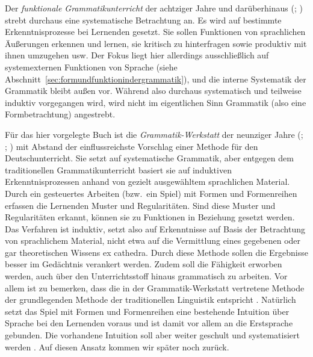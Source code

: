 Der \textit{funktionale Grammatikunterricht} der achtziger Jahre und darüberhinaus (\citealt[233--239]{Bredel2013}; \citealt{Koeller1997}) strebt durchaus eine systematische Betrachtung an.
Es wird auf bestimmte Erkenntnisprozesse bei Lernenden gesetzt.
Sie sollen Funktionen von sprachlichen Äußerungen erkennen und lernen, sie kritisch zu hinterfragen sowie produktiv mit ihnen umzugehen usw.
Der Fokus liegt hier allerdings ausschließlich auf systemexternen Funktionen von Sprache (siehe Abschnitt~\ref{sec:formundfunktionindergrammatik}), und die interne Systematik der Grammatik bleibt außen vor.
Während also durchaus systematisch und teilweise induktiv vorgegangen wird, wird nicht im eigentlichen Sinn Grammatik (also eine Formbetrachtung) angestrebt.

Für das hier vorgelegte Buch ist die \textit{Grammatik-Werkstatt} der neunziger Jahre (\citealt{EisenbergMenzel1995}; \citealt{Menzel2017}; \citealt[Abschnitt~3.2.4]{Bredel2013}) mit Abstand der einflussreichste Vorschlag einer Methode für den Deutschunterricht.
Sie setzt auf systematische Grammatik, aber entgegen dem traditionellen Grammatikunterricht basiert sie auf induktiven Erkenntnisprozessen anhand von gezielt ausgewähltem sprachlichen Material.
Durch ein gesteuertes Arbeiten (bzw.\ ein Spiel) mit Formen und Formenreihen erfassen die Lernenden Muster und Regularitäten.
Sind diese Muster und Regularitäten erkannt, können sie zu Funktionen in Beziehung gesetzt werden.
Das Verfahren ist induktiv, setzt also auf Erkenntnisse auf Basis der Betrachtung von sprachlichem Material, nicht etwa auf die Vermittlung eines gegebenen oder gar theoretischen Wissens ex cathedra.
Durch diese Methode sollen die Ergebnisse besser im Gedächtnis verankert werden.
Zudem soll die Fähigkeit erworben werden, auch über den Unterrichtsstoff hinaus grammatisch zu arbeiten.
Vor allem ist zu bemerken, dass die in der Grammatik-Werkstatt vertretene Methode der grundlegenden Methode der traditionellen Linguistik entspricht \citep[239]{Bredel2013}.
Natürlich setzt das Spiel mit Formen und Formenreihen eine bestehende Intuition über Sprache bei den Lernenden voraus und ist damit vor allem an die Erstsprache gebunden.
Die vorhandene Intuition soll aber weiter geschult und systematisiert werden \citep[241]{Bredel2013}.
Auf diesen Ansatz kommen wir später noch zurück.

